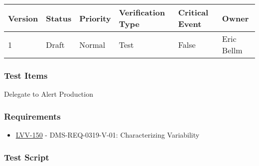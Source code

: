 \begin{longtable}[]{@{}llllll@{}}
\toprule
Version & Status & Priority & Verification Type & Critical Event &
Owner\tabularnewline
\midrule
\endhead
1 & Draft & Normal & Test & False & Eric Bellm\tabularnewline
\bottomrule
\end{longtable}

\hypertarget{test-items-145}{%
\subsubsection{Test Items}\label{test-items-145}}

Delegate to Alert Production

\hypertarget{requirements-146}{%
\subsubsection{Requirements}\label{requirements-146}}

\begin{itemize}
\tightlist
\item
  \href{https://jira.lsstcorp.org/browse/LVV-150}{LVV-150} -
  DMS-REQ-0319-V-01: Characterizing Variability
\end{itemize}

\hypertarget{test-script-146}{%
\subsubsection{Test Script}\label{test-script-146}}

